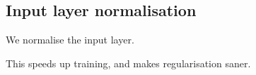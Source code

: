 
\subsection{Input layer normalisation}

We normalise the input layer.

This speeds up training, and makes regularisation saner.

